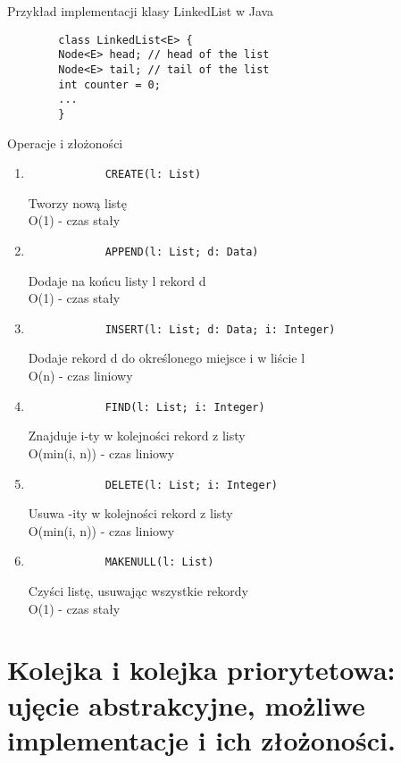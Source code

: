 \documentclass[main.tex]{subfiles}
\begin{document}
    Przykład implementacji klasy LinkedList w Java
    \begin{verbatim}
        class LinkedList<E> {
        Node<E> head; // head of the list
        Node<E> tail; // tail of the list
        int counter = 0;
        ...
        }
    \end{verbatim}

    Operacje i złożoności

    \begin{enumerate}
        \item
        \begin{verbatim}
            CREATE(l: List)
        \end{verbatim}
        Tworzy nową listę \\
        O(1) - czas stały
        \item
        \begin{verbatim}
            APPEND(l: List; d: Data)
        \end{verbatim}
        Dodaje na końcu listy l rekord d \\
        O(1) - czas stały
        \item
        \begin{verbatim}
            INSERT(l: List; d: Data; i: Integer)
        \end{verbatim}
        Dodaje rekord d do określonego miejsce i w liście l \\
        O(n) - czas liniowy
        \item
        \begin{verbatim}
            FIND(l: List; i: Integer)
        \end{verbatim}
        Znajduje i-ty w kolejności rekord z listy \\
        O(min(i, n)) - czas liniowy
        \item
        \begin{verbatim}
            DELETE(l: List; i: Integer)
        \end{verbatim}
        Usuwa -ity w kolejności rekord z listy \\
        O(min(i, n)) - czas liniowy
        \item
        \begin{verbatim}
            MAKENULL(l: List)
        \end{verbatim}
        Czyści listę, usuwając wszystkie rekordy \\
        O(1) - czas stały
    \end{enumerate}
    \newpage
    \section{Kolejka i kolejka priorytetowa: ujęcie abstrakcyjne, możliwe implementacje i ich złożoności.}
\end{document}
